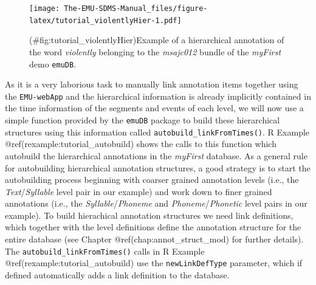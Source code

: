 \documentclass[]{book}
\theoremstyle{definition}
\theoremstyle{definition}
\theoremstyle{definition}
\theoremstyle{remark}
\begin{document}
\begin{figure}
\centering
\texttt{[image: The-EMU-SDMS-Manual\_files/figure-latex/tutorial\_violentlyHier-1.pdf]}
\caption{(\#fig:tutorial\_violentlyHier)Example of a hierarchical
annotation of the word \emph{violently} belonging to the \emph{msajc012}
bundle of the \emph{myFirst} demo \texttt{emuDB}.}
\end{figure}

As it is a very laborious task to manually link annotation items
together using the \texttt{EMU-webApp} and the hierarchical information
is already implicitly contained in the time information of the segments
and events of each level, we will now use a simple function provided by
the \texttt{emuDB} package to build these hierarchical structures using
this information called \texttt{autobuild\_linkFromTimes()}. R Example
@ref(rexample:tutorial\_autobuild) shows the calls to this function
which autobuild the hierarchical annotations in the \emph{myFirst}
database. As a general rule for autobuilding hierarchical annotation
structures, a good strategy is to start the autobuilding process
beginning with coarser grained annotation levels (i.e., the
\emph{Text}/\emph{Syllable} level pair in our example) and work down to
finer grained annotations (i.e., the \emph{Syllable}/\emph{Phoneme} and
\emph{Phoneme}/\emph{Phonetic} level pairs in our example). To build
hierachical annotation structures we need link definitions, which
together with the level definitions define the annotation structure for
the entire database (see Chapter @ref(chap:annot\_struct\_mod) for
further details). The \texttt{autobuild\_linkFromTimes()} calls in R
Example @ref(rexample:tutorial\_autobuild) use the
\texttt{newLinkDefType} parameter, which if defined automatically adds a
link definition to the database.
\end{document}
